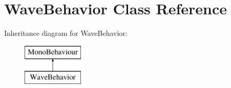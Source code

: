 \hypertarget{class_wave_behavior}{}\section{Wave\+Behavior Class Reference}
\label{class_wave_behavior}
Inheritance diagram for Wave\+Behavior\+:\begin{figure}[H]
\begin{center}
\leavevmode
\includegraphics[height=2.000000cm]{class_wave_behavior}
\end{center}
\end{figure}
